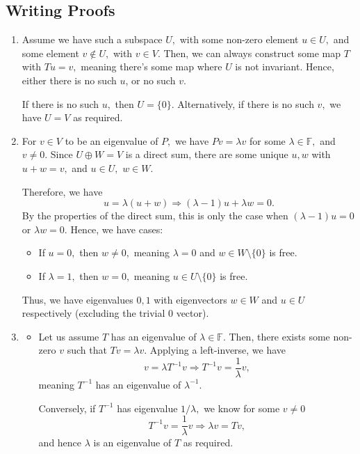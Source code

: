 \documentclass[12pt]{article}
\begin{document}
\subsection{Writing Proofs}
\begin{enumerate}
  \item Assume we have such a subspace $U,$ with some non-zero
    element $u \in U,$ and some element $v \not \in U, $ with $v \in
    V.$ Then, we can always construct some map $T$ with $Tu = v,$
    meaning there's some map where $U$ is not invariant. Hence,
    either there is no such $u$, or no such $v.$

    If there is no such $u,$ then $U = \{0\}.$ Alternatively, if
    there is no such $v,$ we have $U = V$ as required.

  \item For $v \in V$  to be an eigenvalue of $P,$ we have $Pv =
    \lambda v$ for some $\lambda \in \mathbb F,$ and $v \neq 0.$
    Since $U \oplus W  = V$ is a direct sum, there are some unique
    $u, w$ with $u + w = v,$ and $u \in U,$ $w \in W.$

    Therefore, we have $$
    u = \lambda(u + w) \Rightarrow (\lambda - 1)u + \lambda w = 0.
    $$
    By the properties of the direct sum, this is only the case when
    $(\lambda - 1)u = 0$ or $\lambda w = 0.$ Hence, we have cases:
    \begin{itemize}
      \item If $u = 0,$ then $w \neq 0,$ meaning $\lambda = 0$ and $w
        \in W \setminus\{0\}$ is free.
      \item If $\lambda = 1,$ then $w = 0,$ meaning $u \in U
        \setminus \{0\}$ is free.
    \end{itemize}

    Thus, we have eigenvalues $0, 1$ with eigenvectors $w \in W$ and
    $u \in U$ respectively (excluding the trivial $0$ vector).

  \item
    \begin{itemize}
      \item Let us assume $T$ has an eigenvalue of $\lambda \in
        \mathbb F.$ Then, there exists some non-zero $v$ such that
        $Tv = \lambda v.$ Applying a left-inverse, we have
        $$
        v = \lambda T^{-1} v \Rightarrow T^{-1}v = \dfrac{1}{\lambda } v,
        $$
        meaning $T^{-1}$ has an eigenvalue of $\lambda^{-1}.$

        Conversely, if $T^{-1}$ has eigenvalue $1/\lambda,$ we know
        for some $v \neq 0$
        $$
        T^{-1} v = \dfrac{1}{\lambda}{v} \Rightarrow \lambda v = Tv,
        $$
        and hence $\lambda$ is an eigenvalue of $T$ as required.


\end{itemize}
\end{enumerate}
\end{document}
